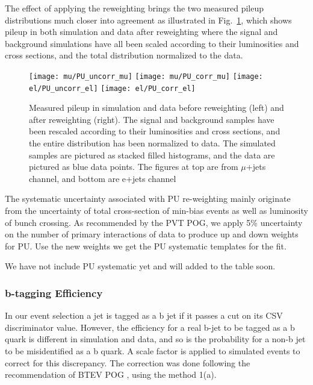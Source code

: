 \documentclass{cmspaperpdf}
\begin{document}
The effect of applying the reweighting brings the two measured pileup distributions much closer into agreement as illustrated in Fig.~\ref{fig:pileup_comparison}, which shows pileup in both simulation and data after reweighting where the signal and background simulations have all been scaled according to their luminosities and cross sections, and the total distribution normalized to the data.

\begin{figure}[hbt]
  \begin{center}
    \texttt{[image: mu/PU\_uncorr\_mu]}
    \texttt{[image: mu/PU\_corr\_mu]}
    \texttt{[image: el/PU\_uncorr\_el]}
    \texttt{[image: el/PU\_corr\_el]}
  \caption{\small Measured pileup in simulation and data before reweighting (left) and after reweighting (right). The signal and background samples have been rescaled according to their luminosities and cross sections, and the entire distribution has been normalized to data. The simulated samples are pictured as stacked filled histograms, and the data are pictured as blue data points. The figures at top are from $\mu$+jets channel, and bottom are e+jets channel}
    \label{fig:pileup_comparison}
  \end{center}
\end{figure}

The systematic uncertainty associated with PU re-weighting mainly originate from the uncertainty of total cross-section of min-bias events as well as luminosity of bunch crossing. As recommended by the PVT POG, we apply 5\% uncertainty on the number of primary interactions of data to produce up and down weights for PU. Use the new weights we get the PU systematic templates for the fit. 

We have not include PU systematic yet and will added to the table soon.

\subsubsection{b-tagging Efficiency}
In our event selection a jet is tagged as a b jet if it passes a cut on its CSV discriminator value. However, the efficiency for a real b-jet to be tagged as a b quark is different in simulation and data, and so is the probability for a non-b jet to be misidentified as a b quark. A scale factor is applied to simulated events to correct for this discrepancy. The correction was done following the recommendation of BTEV POG \cite{Btag_POG}, using the method 1(a).
\end{document}
